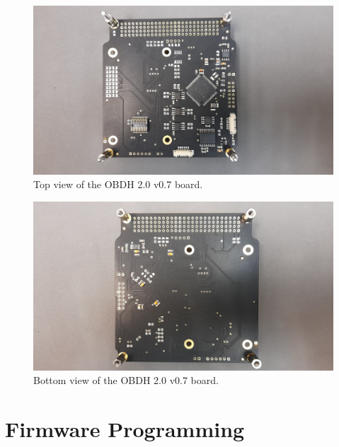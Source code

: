 \begin{figure}[!ht]
    \begin{center}
        \includegraphics[width=\columnwidth]{figures/v07/obdh2-v07-top.jpg}
        \caption{Top view of the OBDH 2.0 v0.7 board.}
        \label{fig:obdh2-v07-top}
    \end{center}
\end{figure}

\begin{figure}[!ht]
    \begin{center}
        \includegraphics[width=\columnwidth]{figures/v07/obdh2-v07-bottom.jpg}
        \caption{Bottom view of the OBDH 2.0 v0.7 board.}
        \label{fig:obdh2-v07-bottom}
    \end{center}
\end{figure}

\section{Firmware Programming}

